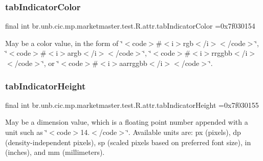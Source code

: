 \subsubsection{\texorpdfstring{tab\+Indicator\+Color}{tabIndicatorColor}}
{\footnotesize\ttfamily final int br.\+unb.\+cic.\+mp.\+marketmaster.\+test.\+R.\+attr.\+tab\+Indicator\+Color =0x7f030154\hspace{0.3cm}{\ttfamily [static]}}

May be a color value, in the form of \char`\"{}$<$code$>$\#$<$i$>$rgb$<$/i$>$$<$/code$>$\char`\"{}, \char`\"{}$<$code$>$\#$<$i$>$argb$<$/i$>$$<$/code$>$\char`\"{}, \char`\"{}$<$code$>$\#$<$i$>$rrggbb$<$/i$>$$<$/code$>$\char`\"{}, or \char`\"{}$<$code$>$\#$<$i$>$aarrggbb$<$/i$>$$<$/code$>$\char`\"{}. \mbox{\label{classbr_1_1unb_1_1cic_1_1mp_1_1marketmaster_1_1test_1_1R_1_1attr_a5d531a4d1b0cd7a0a09473aaee612517}} 
\subsubsection{\texorpdfstring{tab\+Indicator\+Height}{tabIndicatorHeight}}
{\footnotesize\ttfamily final int br.\+unb.\+cic.\+mp.\+marketmaster.\+test.\+R.\+attr.\+tab\+Indicator\+Height =0x7f030155\hspace{0.3cm}{\ttfamily [static]}}

May be a dimension value, which is a floating point number appended with a unit such as \char`\"{}$<$code$>$14.\+5sp$<$/code$>$\char`\"{}. Available units are\+: px (pixels), dp (density-\/independent pixels), sp (scaled pixels based on preferred font size), in (inches), and mm (millimeters). \mbox{\label{classbr_1_1unb_1_1cic_1_1mp_1_1marketmaster_1_1test_1_1R_1_1attr_a370e35a4934a47ad3fb4a7894411221b}} 
